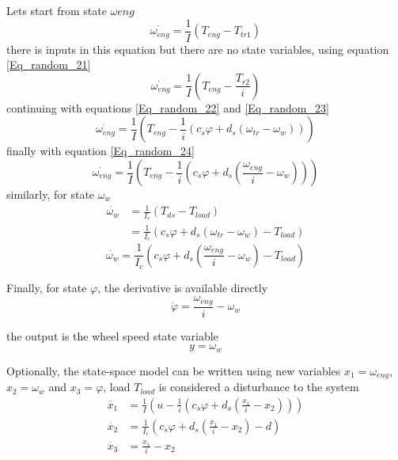 Lets start from state $\omega{eng}$
\begin{equation}
	\dot{\omega_{eng}} = \frac{1}{I}(T_{eng} - T_{tr1})
\end{equation}
there is inputs in this equation but there are no state variables, using equation \eqref{Eq_random_21}
\begin{equation}
	\dot{\omega_{eng}} = \frac{1}{I}(T_{eng} - \frac{T_{r2}}{i} )
\end{equation}
continuing with equations \eqref{Eq_random_22} and \eqref{Eq_random_23}
\begin{equation}
	\dot{\omega_{eng}} = \frac{1}{I}(T_{eng} - \frac{1}{i}(c_s \varphi + d_s (\omega_{tr} - \omega_{w})))
\end{equation}
finally with equation \eqref{Eq_random_24}
\begin{equation}
	\dot{\omega_{eng}} = \frac{1}{I}(T_{eng} - \frac{1}{i}(c_s \varphi + d_s (\frac{\omega_{eng}}{i} - \omega_{w})))
\end{equation}
similarly, for state $\omega_{w}$
\begin{align*}
	\dot{\omega_{w}} &= \frac{1}{I_c} (T_{ds} - T_{load}) \\
					&= \frac{1}{I_c} (c_s \varphi + d_s (\omega_{tr} - \omega_{w}) - T_{load})
\end{align*}
\begin{equation}
	\dot{\omega_{w}} = \frac{1}{I_c} (c_s \varphi + d_s (\frac{\omega_{eng}}{i} - \omega_{w}) - T_{load})
\end{equation}

Finally, for state $\varphi$, the derivative is available directly
\begin{equation}
	\dot{\varphi} = \frac{\omega_{eng}}{i} - \omega_{w}
\end{equation}

the output is the wheel speed state variable
\begin{equation}
	y = \omega_{w}
\end{equation}

Optionally, the state-space model can be written using new variables $x_1 = \omega_{eng}$, $x_2 = \omega_{w}$ and $x_3 = \varphi$, load $T_{load}$ is considered a disturbance to the system
\begin{align}
	\dot{x_1} &= \frac{1}{I}(u - \frac{1}{i}(c_s \varphi + d_s (\frac{x_1}{i} - x_2))) \\
	\dot{x_2} &= \frac{1}{I_c} (c_s \varphi + d_s (\frac{x_1}{i} - x_2) - d) \\
	\dot{x_3} &= \frac{x_1}{i} - x_2
\end{align}


